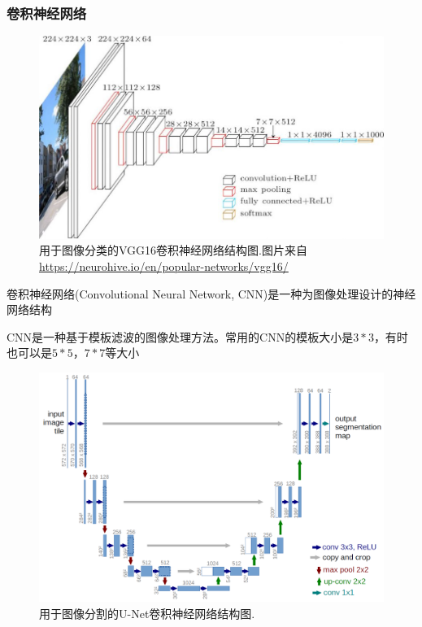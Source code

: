\subsubsection{卷积神经网络}
\par
\begin{figure}[htbp!]
    \centering
    \includegraphics[width = 1.\textwidth]{chap/img/vgg16-neural-network.jpg}
    \caption{
        用于图像分类的VGG16\supercite{simonyan2014very}卷积神经网络结构图.图片来自 \url{https://neurohive.io/en/popular-networks/vgg16/}
        }\label{fig:vgg16_architecture}
\end{figure}
\par
卷积神经网络(Convolutional Neural Network, CNN)是一种为图像处理设计的神经网络结构


CNN是一种基于模板滤波的图像处理方法。常用的CNN的模板大小是$3*3$，有时也可以是$5*5$，$7*7$等大小


\par
\begin{figure}[htbp!]
    \centering
    \includegraphics[width = 1.\textwidth]{chap/img/u-net-architecture.png}
    \caption{
        用于图像分割的U-Net\supercite{ronneberger2015u}卷积神经网络结构图.
        }\label{fig:unet_architecture}
\end{figure}
\par

